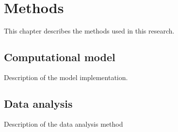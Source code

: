 \chapter{Methods}

This chapter describes the methods used in this research.

\section{Computational model}
Description of the \textcite{sanjayImpairedDendriticInhibition2015} model
implementation.

\section{Data analysis}
Description of the data analysis method

